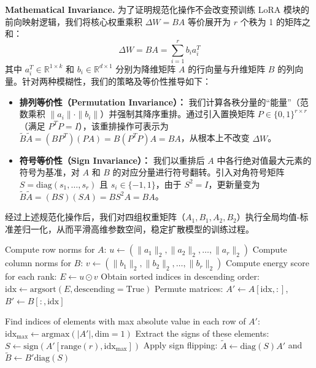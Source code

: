 \documentclass[12pt,a4paper]{article}
\begin{document}
\textbf{Mathematical Invariance.} 
为了证明规范化操作不会改变预训练 LoRA 模块的前向映射逻辑，我们将核心权重乘积 $\Delta W = BA$ 等价展开为 $r$ 个秩为 1 的矩阵之和：
\begin{equation}
\Delta W = BA = \sum_{i=1}^{r} b_i a_i^T
\end{equation}
其中 $a_i^T \in \mathbb{R}^{1 \times k}$ 和 $b_i \in \mathbb{R}^{d \times 1}$ 分别为降维矩阵 $A$ 的行向量与升维矩阵 $B$ 的列向量。针对两种模糊性，我们的策略及等价性推导如下：

\begin{itemize}
    \item \textbf{排列等价性（Permutation Invariance）：} 我们计算各秩分量的“能量”（范数乘积 $\|a_i\| \cdot \|b_i\|$）并强制其降序重排。通过引入置换矩阵 $P \in \{0,1\}^{r \times r}$（满足 $P^T P = I$），该重排操作可表示为 $\tilde{B}\tilde{A} = (BP^T)(PA) = B(P^TP)A = BA$，从根本上不改变 $\Delta W$。
    
    \item \textbf{符号等价性（Sign Invariance）：} 我们以重排后 $A$ 中各行绝对值最大元素的符号为基准，对 $A$ 和 $B$ 的对应分量进行符号翻转。引入对角符号矩阵 $S = \text{diag}(s_1, \dots, s_r)$ 且 $s_i \in \{-1, 1\}$，由于 $S^2 = I$，更新量变为 $\tilde{B}\tilde{A} = (BS)(SA) = BS^2A = BA$。
\end{itemize}

经过上述规范化操作后，我们对四组权重矩阵（$A_1, B_1, A_2, B_2$）执行全局均值-标准差归一化，从而平滑高维参数空间，稳定扩散模型的训练过程。

\begin{algorithm}[htpb]
\caption{LoRA Parameter Canonicalization}
\label{alg:canonicalization}
Compute row norms for $A$: $u \leftarrow (\|a_1\|_2, \|a_2\|_2, \dots, \|a_r\|_2)$\;
Compute column norms for $B$: $v \leftarrow (\|b_1\|_2, \|b_2\|_2, \dots, \|b_r\|_2)$\;
Compute energy score for each rank: $E \leftarrow u \odot v$\;
Obtain sorted indices in descending order: $\text{idx} \leftarrow \text{argsort}(E, \text{descending}=\text{True})$\;
Permute matrices: $A' \leftarrow A[\text{idx}, :]$, $B' \leftarrow B[:, \text{idx}]$\;

Find indices of elements with max absolute value in each row of $A'$: 
$\text{idx}_{\max} \leftarrow \text{argmax}(|A'|, \text{dim}=1)$\;
Extract the signs of these elements: 
$S \leftarrow \text{sign}\left( A'[\text{range}(r), \text{idx}_{\max}] \right)$\;
Apply sign flipping: $\tilde{A} \leftarrow \text{diag}(S) A'$ and $\tilde{B} \leftarrow B' \text{diag}(S)$\;
\end{algorithm}
\end{document}
